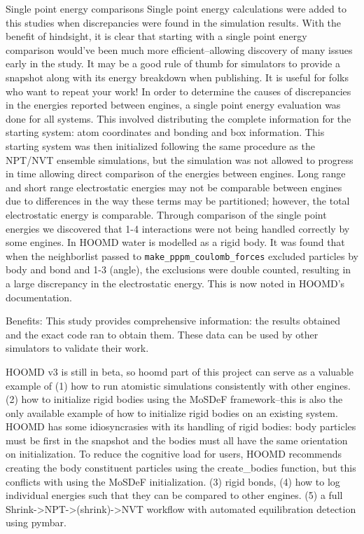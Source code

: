 

Single point energy comparisons
Single point energy calculations were added to this studies when discrepancies were found in the simulation results. With the benefit of hindsight, it is clear that starting with a single point energy comparison would've been much more efficient--allowing discovery of many issues early in the study. It may be a good rule of thumb for simulators to provide a snapshot along with its energy breakdown when publishing. It is useful for folks who want to repeat your work!
In order to determine the causes of discrepancies in the energies reported between engines, a single point energy evaluation was done for all systems. This involved distributing the complete information for the starting system: atom coordinates and bonding and box information. This starting system was then initialized following the same procedure as the NPT/NVT ensemble simulations, but the simulation was not allowed to progress in time allowing direct comparison of the energies between engines.
Long range and short range electrostatic energies may not be comparable between engines due to differences in the way these terms may be partitioned; however, the total electrostatic energy is comparable.
Through comparison of the single point energies we discovered that 1-4 interactions were not being handled correctly by some engines.
In HOOMD water is modelled as a rigid body. It was found that when the neighborlist passed to \lstinline{make_pppm_coulomb_forces} excluded particles by body and bond and 1-3 (angle), the exclusions were double counted, resulting in a large discrepancy in the electrostatic energy. This is now noted in HOOMD's documentation.

Benefits:
This study provides comprehensive information: the results obtained and the exact code ran to obtain them. These data can be used by other simulators to validate their work.

HOOMD v3 is still in beta, so hoomd part of this project can serve as a valuable example of (1) how to run atomistic simulations consistently with other engines. (2) how to initialize rigid bodies using the MoSDeF framework--this is also the only available example of how to initialize rigid bodies on an existing system. HOOMD has some idiosyncrasies with its handling of rigid bodies: body particles must be first in the snapshot and the bodies must all have the same orientation on initialization. To reduce the cognitive load for users, HOOMD recommends creating the body constituent particles using the create\_bodies function, but this conflicts with using the MoSDeF initialization. (3) rigid bonds, (4) how to log individual energies such that they can be compared to other engines. (5) a full Shrink->NPT->(shrink)->NVT workflow with automated equilibration detection using pymbar.

